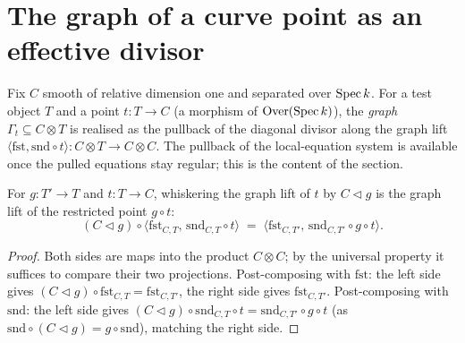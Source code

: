\section{The graph of a curve point as an effective divisor}

Fix \(C\) smooth of relative dimension one and separated over \(\operatorname{Spec} k\). For a test object \(T\)
and a point \(t \colon T \to C\) (a morphism of \(\mathrm{Over}(\operatorname{Spec} k)\)), the \emph{graph}
\(\Gamma_t \subseteq C \otimes T\) is realised as the pullback of the diagonal divisor along the
graph lift \(\langle \mathrm{fst}, \mathrm{snd} \circ t\rangle \colon C \otimes T \to C \otimes C\).
The pullback of the local-equation system is available once the pulled equations stay regular; this
is the content of the section.

\begin{lemma}
  \label{pa-lem:whiskerLeft_comp_graphLift}
  \leanok

  For \(g \colon T' \to T\) and \(t \colon T \to C\), whiskering the graph lift of \(t\) by
  \(C \lhd g\) is the graph lift of the restricted point \(g \circ t\):
  \[
    (C \lhd g) \circ \langle \mathrm{fst}_{C,T},\, \mathrm{snd}_{C,T} \circ t\rangle
      \;=\; \langle \mathrm{fst}_{C,T'},\, \mathrm{snd}_{C,T'} \circ g \circ t\rangle .
  \]
\end{lemma}
\begin{proof}
  \leanok
  Both sides are maps into the product \(C \otimes C\); by the universal property it suffices to
  compare their two projections. Post-composing with \(\mathrm{fst}\): the left side gives \((C
  \lhd g) \circ \mathrm{fst}_{C,T} = \mathrm{fst}_{C,T'}\), the right side gives
  \(\mathrm{fst}_{C,T'}\). Post-composing with \(\mathrm{snd}\): the left side gives \((C \lhd g)
  \circ \mathrm{snd}_{C,T} \circ t = \mathrm{snd}_{C,T'} \circ g \circ t\) (as \(\mathrm{snd} \circ
  (C \lhd g) = g \circ \mathrm{snd}\)), matching the right side.
\end{proof}

